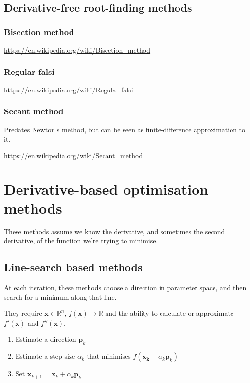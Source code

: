 \documentclass[10pt]{article}
\begin{document}
%
%
\subsection{Derivative-free root-finding methods}

\subsubsection{Bisection method}

\url{https://en.wikipedia.org/wiki/Bisection_method}

\subsubsection{Regular falsi}

\url{https://en.wikipedia.org/wiki/Regula_falsi}

\subsubsection{Secant method}

Predates Newton's method, but can be seen as finite-difference approximation to it.

\url{https://en.wikipedia.org/wiki/Secant_method}

%
%
%
%
\section{Derivative-based optimisation methods}

These methods assume we know the derivative, and sometimes the second derivative, of the function we're trying to minimise.

%
%
\subsection{Line-search based methods}

At each iteration, these methods choose a direction in parameter space, and then search for a minimum along that line.

They require $\bm{x} \in \mathbb{R}^n$, $f(\bm{x}) \to \mathbb{R}$ and the ability to calculate or approximate $f'(\bm{x})$ and $f''(\bm{x})$.

\begin{enumerate}
\item Estimate a direction $\bm{p}_k$
\item Estimate a step size $\alpha_k$ that minimises $f(\bm{x_k} + \alpha_k\bm{p}_k)$
\item Set $\bm{x}_{k+1} = \bm{x}_k + \alpha_k\bm{p}_k$
\end{enumerate}
\end{document}
